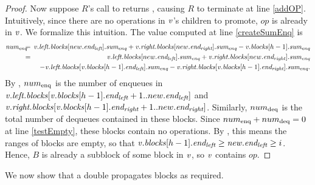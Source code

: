 \begin{proof}
Now suppose $R$'s call to  returns \nl, causing $R$ to terminate at line \ref{addOP}.
Intuitively, since there are no operations in $\mbox{\textnormal{\textit{v}}}$'s children to promote, $op$ is already in $\mbox{\textnormal{\textit{v}}}$.
We formalize this intuition.
The value computed at line \ref{createSumEnq} is
\begin{eqnarray*}
\var{num\sub{enq}} \hspace*{-2mm}
&=& \hspace*{-2mm} \var{v}.\fld{left.blocks}[new.\eleft].\fld{sum\sub{enq}} + \var{v}.\fld{right.blocks}[new.\eright].\fld{sum\sub{enq}} - \var{v}.\fld{blocks}[h-1].\fld{sum\sub{enq}} \\
&=& \hspace*{-2mm}\var{v}.\fld{left.blocks}[new.\eleft].\fld{sum\sub{enq}} + \var{v}.\fld{right.blocks}[new.\eright].\fld{sum\sub{enq}} \\
&&- \var{v}.\fld{left.blocks}[\var{v}.\fld{blocks}[h-1].\eleft].\fld{sum\sub{enq}} - \var{v}.\fld{right.blocks}[\var{v}.\fld{blocks}[h-1].\eright].\fld{sum\sub{enq}}.
\end{eqnarray*}
By , $num\textsubscript{enq}$ is the  number of enqueues  in 
$\mbox{\textnormal{\textit{v}}}.\mbox{\textit{left.blocks}}[\mbox{\textnormal{\textit{v}}}.\mbox{\textit{blocks}}[h-1].\mbox{\textit{end\textsubscript{left}}}+1..new.\mbox{\textit{end\textsubscript{left}}}]$ and
$\mbox{\textnormal{\textit{v}}}.\mbox{\textit{right.blocks}}[\mbox{\textnormal{\textit{v}}}.\mbox{\textit{blocks}}[h-1].\mbox{\textit{end\textsubscript{right}}}+1..new.\mbox{\textit{end\textsubscript{right}}}]$.
Similarly, $num\textsubscript{deq}$ is the total number of dequeues contained in these blocks.
Since $num\textsubscript{enq}+num\textsubscript{deq}=0$ at line \ref{testEmpty},
these blocks contain no operations.
By , this means the ranges of blocks are empty, so that $\mbox{\textnormal{\textit{v}}}.\mbox{\textit{blocks}}[h-1].\mbox{\textit{end\textsubscript{left}}} \geq \mbox{\textnormal{\textit{new}}}.\mbox{\textit{end\textsubscript{left}}} \geq i$.
Hence, $B$ is already a subblock of some block in $\mbox{\textnormal{\textit{v}}}$, so $\mbox{\textnormal{\textit{v}}}$ contains $op$.
\end{proof}

We now show that a double  propagates blocks as required.


